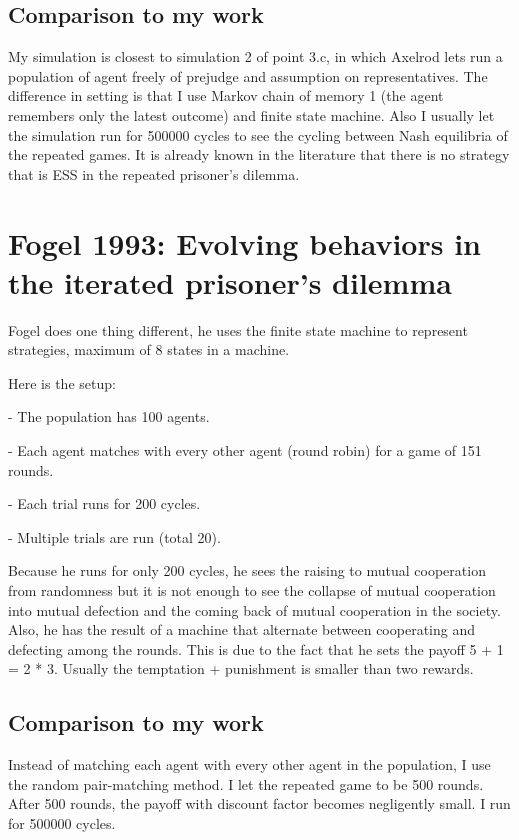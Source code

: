 \documentclass[12.5pt]{report}
\begin{document}
\subsection{Comparison to my work}
My simulation is closest to simulation 2 of point 3.c, in which Axelrod lets run a population of agent freely of prejudge and assumption on representatives. The difference in setting is that I use Markov chain of memory 1 (the agent remembers only the latest outcome) and finite state machine. Also I usually let the simulation run for 500000 cycles to see the cycling between Nash equilibria of the repeated games. It is already known in the literature that there is no strategy that is ESS in the repeated prisoner’s dilemma.

\section{Fogel 1993: Evolving behaviors in the iterated prisoner’s dilemma}

Fogel does one thing different, he uses the finite state machine to represent strategies, maximum of 8 states in a machine. 

Here is the setup:

- The population has 100 agents.

- Each agent matches with every other agent (round robin) for a game of 151 rounds.

- Each trial runs for 200 cycles.

- Multiple trials are run (total 20).

Because he runs for only 200 cycles, he sees the raising to mutual cooperation from randomness but it is not enough to see the collapse of mutual cooperation into mutual defection and the coming back of mutual cooperation in the society.\\

Also, he has the result of a machine that alternate between cooperating and defecting among the rounds. This is due to the fact that he sets the payoff 5 + 1 = 2 * 3. Usually the temptation + punishment is smaller than two rewards.\\

\subsection{Comparison to my work}
Instead of matching each agent with every other agent in the population, I use the random pair-matching method. I let the repeated game to be 500 rounds. After 500 rounds, the payoff with discount factor becomes negligently small. I run for 500000 cycles.
\end{document}
